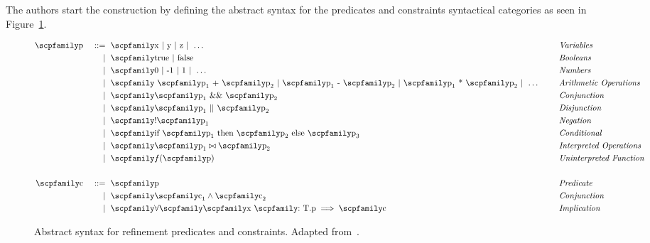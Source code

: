 \documentclass[
  oneside,
  english,
  coorientadorbanca,
  noabntexcite
]{ufsc-thesis-rn46-2019}
\def\bnfdef{::=}
\newcommand{\codett}[1]{\text{\scpfamily#1}}
\newcommand{\code}[1]{\text{\scpfamily\setlength\spaceskip{0.35em}#1}}
\newcommand{\bnfmore}[1]{            & \ & \mid{}    & \ \code{#1}}
\newcommand{\astprod}[2]{\code{#1} & \ & \bnfdef{} & \ \code{#2}}
\newcommand{\astmore}[1]{\bnfmore{#1}}
\newcommand{\typer}[2]{\code{#1 \codett{:} #2}}
\begin{document}
The authors start the construction by defining the abstract syntax for the predicates and constraints syntactical categories as seen in Figure~\ref{fig:refinement_predicates}.
\begin{figure}[ht]
  \begin{minipage}{\textwidth}
    \begin{alignat*}{4}
      \astprod{p}{x $\mid$ y $\mid$ z $\mid\ \dots$} & \quad & \textit{Variables}              \\
      \astmore{true $\mid$ false}                    & \quad & \textit{Booleans}               \\
      \astmore{0 $\mid$ -1 $\mid$ 1 $\mid\ \dots$ }  & \quad & \textit{Numbers}                \\
      \astmore{
        $\code{p}_1$ + $\code{p}_2$
        $\mid$ $\code{p}_1$ - $\code{p}_2$
        $\mid$ $\code{p}_1$ * $\code{p}_2$
        $\mid\ \dots$
      }                                              & \quad & \textit{Arithmetic Operations}  \\
      \astmore{$\code{p}_1$ \&\& $\code{p}_2$}       & \quad & \textit{Conjunction}            \\
      \astmore{$\code{p}_1$ || $\code{p}_2$}         & \quad & \textit{Disjunction}            \\
      \astmore{!$\code{p}_1$}                        & \quad & \textit{Negation}               \\
      \astmore{if $\code{p}_1$ then $\code{p}_2$ else $\code{p}_3$}
                                                     & \quad & \textit{Conditional}            \\
      \astmore{$\code{p}_1\bowtie\code{p}_2$}        & \quad & \textit{Interpreted Operations} \\
      \astmore{$f{(\code{p})}$}                      & \quad & \textit{Uninterpreted Function} \\
      \\
      \astprod{c}{p}                                 & \quad & \textit{Predicate}              \\
      \astmore{$\code{c}_1\land\code{c}_2$}          & \quad & \textit{Conjunction}            \\
      \astmore{$\forall\code{\typer{x}{T}.p}\implies\code{c}$ }
                                                     & \quad & \textit{Implication}            \\
    \end{alignat*}
  \end{minipage}
  \caption{
    Abstract syntax for refinement predicates and constraints.
    Adapted from~\cite{jhala2020tutorial}.
  }\label{fig:refinement_predicates}
\end{figure}
\end{document}
